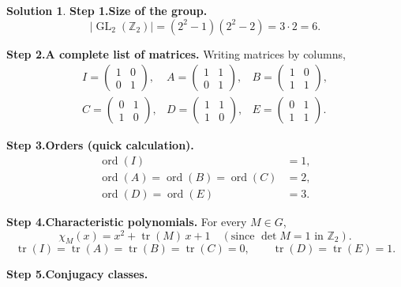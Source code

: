 \documentclass[12pt]{article}
\title{}
\author{Jerich Lee}
\date{\today}
\theoremstyle{definition} %
\newtheorem{solution}{Solution}
\theoremstyle{plain} %
\begin{document}
\maketitle
\begin{solution}
  \textbf{Step 1.\;Size of the group.}
  \[
  \bigl|\operatorname{GL}_{2}(\mathbb{Z}_{2})\bigr|
     =(2^{2}-1)(2^{2}-2)=3\cdot2=6.
  \]
  
  \textbf{Step 2.\;A complete list of matrices.}  Writing matrices by columns,
  \[
  \renewcommand{\arraystretch}{1.2}
  \begin{array}{lll}
  I=\begin{pmatrix}1&0\\0&1\end{pmatrix},&
  A=\begin{pmatrix}1&1\\0&1\end{pmatrix},&
  B=\begin{pmatrix}1&0\\1&1\end{pmatrix},\\[4pt]
  C=\begin{pmatrix}0&1\\1&0\end{pmatrix},&
  D=\begin{pmatrix}1&1\\1&0\end{pmatrix},&
  E=\begin{pmatrix}0&1\\1&1\end{pmatrix}.
  \end{array}
  \]
  
  \textbf{Step 3.\;Orders (quick calculation).}
  \[
  \begin{aligned}
  \operatorname{ord}(I)&=1,\\
  \operatorname{ord}(A)=\operatorname{ord}(B)=\operatorname{ord}(C)&=2,\\
  \operatorname{ord}(D)=\operatorname{ord}(E)&=3.
  \end{aligned}
  \]
  
  \textbf{Step 4.\;Characteristic polynomials.}\;
  For every \(M\in G\),
  \[
  \chi_{M}(x)=x^{2}+\operatorname{tr}(M)\,x+1
  \quad(\text{since }\det M=1 \text{ in } \mathbb{Z}_{2}).
  \]
  \[
  \operatorname{tr}(I)=\operatorname{tr}(A)=\operatorname{tr}(B)
            =\operatorname{tr}(C)=0,
  \qquad
  \operatorname{tr}(D)=\operatorname{tr}(E)=1.
  \]
  
  \smallskip
  \textbf{Step 5.\;Conjugacy classes.}
  

\end{solution}
\end{document}
